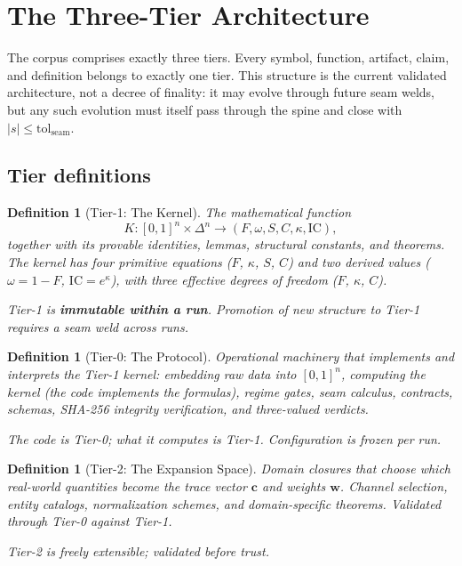 \documentclass[
  aps,
  prd,
  twocolumn,
  superscriptaddress,
  nofootinbib,
  floatfix
]{revtex4-2}
\newtheorem{definition}[theorem]{Definition}
\newcommand{\tolseam}{\mathrm{tol}_{\mathrm{seam}}}
\newcommand{\beq}{\begin{equation}}
\newcommand{\eeq}{\end{equation}}
\newcommand{\tvec}{\mathbf{c}}
\newcommand{\wvec}{\mathbf{w}}
\newcommand{\IC}{\mathrm{IC}}
\begin{document}
\section{The Three-Tier Architecture}\label{sec:tiers}

The corpus comprises exactly three tiers.
Every symbol, function, artifact, claim, and definition belongs
to exactly one tier.  This structure is the current validated
architecture, not a decree of finality: it may evolve through
future seam welds, but any such evolution must itself pass
through the spine and close with $|s| \leq \tolseam$.

\subsection{Tier definitions}

\begin{definition}[Tier-1: The Kernel]
\label{def:tier1}
The mathematical function
\beq
  K: [0,1]^n \times \Delta^n \to (F, \omega, S, C, \kappa, \IC),
\eeq
together with its provable identities, lemmas, structural constants,
and theorems.  The kernel has four primitive equations ($F$, $\kappa$,
$S$, $C$) and two derived values ($\omega = 1 - F$, $\IC = e^\kappa$),
with three effective degrees of freedom ($F$, $\kappa$, $C$).

Tier-1 is \textbf{immutable within a run}.  Promotion of new
structure to Tier-1 requires a seam weld across runs.
\end{definition}

\begin{definition}[Tier-0: The Protocol]
\label{def:tier0}
Operational machinery that \emph{implements and interprets} the
Tier-1 kernel: embedding raw data into $[0,1]^n$, computing the
kernel (the code implements the formulas), regime gates, seam
calculus, contracts, schemas, SHA-256 integrity verification,
and three-valued verdicts.

The code is Tier-0; \emph{what it computes} is Tier-1.
Configuration is frozen per run.
\end{definition}

\begin{definition}[Tier-2: The Expansion Space]
\label{def:tier2}
Domain closures that choose which real-world quantities become the
trace vector $\tvec$ and weights $\wvec$.  Channel selection, entity
catalogs, normalization schemes, and domain-specific theorems.
Validated through Tier-0 against Tier-1.

Tier-2 is freely extensible; validated before trust.
\end{definition}
\end{document}
